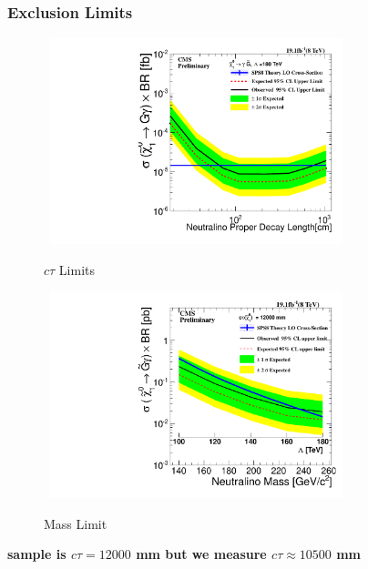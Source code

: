 \documentclass{beamer}
\begin{document}
\begin{frame}
\frametitle{Exclusion Limits}
\begin{figure}[ht]
\begin{minipage}[b]{0.45\linewidth}
\centering
\mbox{
\includegraphics[height=6cm,width=\textwidth]{THESISPLOTS/180TeV_Neutralino_CrossSecTimesBR_Uplimit.pdf}}
\vspace{-1cm}
\caption{$c\tau$ Limits }
\label{fig:ctaulimit}
\end{minipage}
\hspace{0.1cm}
\begin{minipage}[b]{0.45\linewidth}
\centering
\mbox{
\includegraphics[height=6cm, width=\textwidth]{THESISPLOTS/Neutralino_CrosSecVsMass_Exclusion_limit_12000.pdf}}
\vspace{-1cm}
\caption{Mass Limit }
\label{fig:masslimit}
\end{minipage}
\end{figure}
\vspace{-1cm}
\alert{\textbf{sample is $c\tau= 12000$ mm but we measure $c\tau \approx 10500$ mm}}
\end{frame}
\end{document}
